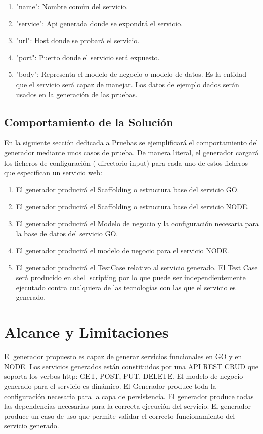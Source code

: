 \documentclass[a4paper,11pt]{book}
\begin{document}
\begin{enumerate}
\item "name": Nombre común del servicio.
\item "service": Api generada donde se expondrá el servicio.
\item "url":  Host donde se probará el servicio.
\item "port": Puerto donde el servicio será expuesto.
\item "body": Representa el modelo de negocio o modelo de datos. Es la entidad que el servicio será capaz de manejar.  Los datos de ejemplo dados serán usados en la generación de las pruebas. 
\end{enumerate}

\subsection{Comportamiento de la Solución}

En la siguiente sección dedicada a Pruebas se ejemplificará el comportamiento del generador mediante unos casos de prueba. De manera literal, el generador cargará los ficheros de configuración ( directorio input) para cada uno de estos ficheros que especifican un servicio web: 

\begin{enumerate}
\item El generador producirá el Scaffolding o estructura base del servicio GO.
\item El generador producirá el Scaffolding o estructura base del servicio NODE.
\item  El generador producirá el Modelo de negocio y la configuración necesaria para la base de datos del servicio GO.
\item El generador producirá el modelo de negocio para el servicio NODE.
\item El generador producirá el TestCase relativo al servicio generado. El Test Case será producido en shell scripting por lo que puede ser independientemente ejecutado contra cualquiera de las tecnologías con las que el servicio es generado.
\end{enumerate}

\section{Alcance y Limitaciones}

El generador propuesto es capaz de generar servicios funcionales en GO y en NODE. Los servicios generados están constituidos por una API REST CRUD que soporta los verbos http: GET, POST, PUT, DELETE.  El modelo de negocio generado para el servicio es dinámico. El Generador produce toda la configuración necesaria para la capa de persistencia. El generador produce todas las dependencias necesarias para la correcta ejecución del servicio. El generador produce un caso de uso que permite validar el correcto funcionamiento del servicio generado. 
\end{document}

